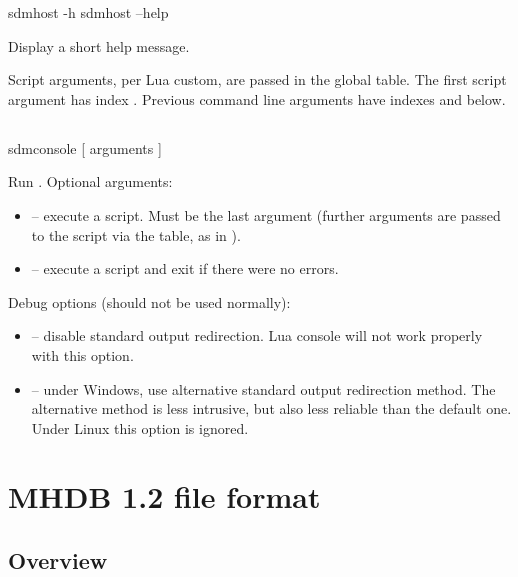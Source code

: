 \documentclass[a4paper,12pt,twoside,extrafontsizes]{memoir}
\begin{document}
\begin{shellcmds}
sdmhost -h
sdmhost --help
\end{shellcmds}

Display a short help message.

Script arguments, per Lua custom, are passed in the  global table. The first script argument has index . Previous command line arguments have indexes  and below.

\section[sdmconsole]{}

\begin{shellcmds}
sdmconsole [ arguments ]
\end{shellcmds}

Run . Optional arguments:

\begin{itemize}
	\item {} -- execute a script. Must be the last argument (further arguments are passed to the script via the  table, as in ).
	\item {} -- execute a script and exit if there were no errors.
\end{itemize}

Debug options (should not be used normally):

\begin{itemize}
	\item {} -- disable standard output redirection. Lua console will not work properly with this option.
	\item {} -- under Windows, use alternative standard output redirection method. The alternative method is less intrusive, but also less reliable than the default one. Under Linux this option is ignored.
\end{itemize}

\chapter{MHDB 1.2 file format}
\label{app:mhdbformat}

\section{Overview}
\end{document}
